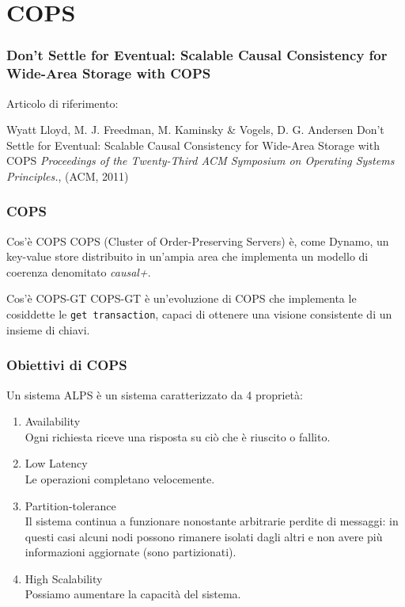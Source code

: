 \section{COPS}
\begin{frame}
  \frametitle{Don't Settle for Eventual: Scalable Causal Consistency for Wide-Area Storage with COPS}
  Articolo di riferimento: \\
  \begin{thebibliography}{9}
   Wyatt Lloyd, M. J. Freedman, M. Kaminsky \& Vogels, D. G. Andersen
  \newblock Don't Settle for Eventual: Scalable Causal Consistency for Wide-Area Storage with COPS
  \newblock \emph{Proceedings of the Twenty-Third ACM Symposium on Operating Systems Principles.}, (ACM, 2011)
  \end{thebibliography}
\end{frame}

\begin{frame}
\frametitle{COPS}
\begin{block}{Cos'è COPS}
COPS (Cluster of Order-Preserving Servers) è, come Dynamo,
un key-value store distribuito in un'ampia area che implementa un modello di coerenza
denomitato \textit{causal+}.
\end{block}
\begin{block}{Cos'è COPS-GT}
COPS-GT è un'evoluzione di COPS che implementa le cosiddette le \texttt{get transaction},
capaci di ottenere una visione consistente di un insieme di chiavi.
\end{block}
\end{frame}

\begin{frame}
\frametitle{Obiettivi di COPS}
	\begin{definizione}
	Un \alert{sistema ALPS} è un sistema caratterizzato da 4 proprietà:
	\begin{enumerate}
		\item<1-> Availability \\
				  Ogni richiesta riceve una risposta su ciò che è riuscito o fallito.
		\item<1-> Low Latency \\
				  Le operazioni completano velocemente.
		\item<1-> Partition-tolerance \\
				  Il sistema continua a funzionare nonostante arbitrarie perdite di messaggi:
				  in questi casi alcuni nodi possono rimanere isolati dagli altri e non avere
				  più informazioni aggiornate (sono partizionati).
		\item<1-> High Scalability \\
				  Possiamo aumentare la capacità del sistema.
	\end{enumerate}
	\end{definizione}
\end{frame}

